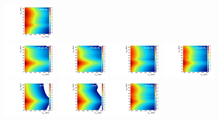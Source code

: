 \begin{figure}[htbp]
  \includegraphics[width=0.2\textwidth]{fig/analysisAppendix/template_res_e_LP_bb_HDy.pdf}\\
  \includegraphics[width=0.2\textwidth]{fig/analysisAppendix/template_res_mu_HP_nobb_HDy.pdf}
  \includegraphics[width=0.2\textwidth]{fig/analysisAppendix/template_res_e_HP_nobb_HDy.pdf}
  \includegraphics[width=0.2\textwidth]{fig/analysisAppendix/template_res_mu_LP_nobb_HDy.pdf}
  \includegraphics[width=0.2\textwidth]{fig/analysisAppendix/template_res_e_LP_nobb_HDy.pdf}\\
  \includegraphics[width=0.2\textwidth]{fig/analysisAppendix/template_res_mu_HP_vbf_HDy.pdf}
  \includegraphics[width=0.2\textwidth]{fig/analysisAppendix/template_res_e_HP_vbf_HDy.pdf}
  \includegraphics[width=0.2\textwidth]{fig/analysisAppendix/template_res_mu_LP_vbf_HDy.pdf}

\end{figure}
